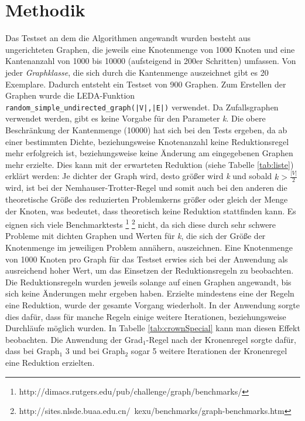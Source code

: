 \section{Methodik}
\label{ch:Analyse:sec:Methodik}
Das Testset an dem die Algorithmen angewandt wurden besteht aus ungerichteten Graphen, die jeweils eine Knotenmenge von 1000 Knoten und eine Kantenanzahl von 1000 bis 10000 (aufsteigend in 200er Schritten) umfassen. Von jeder \emph{Graphklasse}, die sich durch die Kantenmenge auszeichnet gibt es 20 Exemplare. Dadurch entsteht ein Testset von 900 Graphen. Zum Erstellen der Graphen wurde die LEDA-Funktion \lstinline{random_simple_undirected_graph(|V|,|E|)} \cite{manual} verwendet. Da Zufallsgraphen verwendet werden, gibt es keine Vorgabe für den Parameter \emph{k}. Die obere Beschränkung der Kantenmenge (10000) hat sich bei den Tests ergeben, da ab einer bestimmten Dichte, beziehungsweise Knotenanzahl keine Reduktionsregel mehr erfolgreich ist, beziehungsweise keine Änderung am eingegebenen Graphen mehr erzielte. Dies kann mit der erwarteten Reduktion (siehe Tabelle \ref{tab:liste}) erklärt werden: Je dichter der Graph wird, desto größer wird \emph{k} und sobald $k>\frac{|V|}{2}$ wird, ist bei der Nemhauser-Trotter-Regel und somit auch bei den anderen die theoretische Größe des reduzierten Problemkerns größer oder gleich der Menge der Knoten, was bedeutet, dass theoretisch keine Reduktion stattfinden kann. Es eignen sich viele Benchmarktests \footnote{http://dimacs.rutgers.edu/pub/challenge/graph/benchmarks/} \footnote{http://sites.nlsde.buaa.edu.cn/~kexu/benchmarks/graph-benchmarks.htm} nicht, da sich diese durch sehr schwere Probleme mit dichten Graphen und Werten für \emph{k}, die sich der Größe der Knotenmenge im jeweiligen Problem annähern, auszeichnen. Eine Knotenmenge von 1000 Knoten pro Graph für das Testset erwies sich bei der Anwendung als ausreichend hoher Wert, um das Einsetzen der Reduktionsregeln zu beobachten.\\
Die Reduktionsregeln wurden jeweils solange auf einen Graphen angewandt, bis sich keine Änderungen mehr ergeben haben. Erzielte mindestens eine der Regeln eine Reduktion, wurde der gesamte Vorgang wiederholt. In der Anwendung sorgte dies dafür, dass für manche Regeln einige weitere Iterationen, beziehungsweise Durchläufe möglich wurden. In Tabelle \ref{tab:crownSpecial} kann man diesen Effekt beobachten. Die Anwendung der Grad$_{1}$-Regel nach der Kronenregel sorgte dafür, dass bei Graph$_{1}$ 3 und bei Graph$_{2}$ sogar 5 weitere Iterationen der Kronenregel eine Reduktion erzielten.
